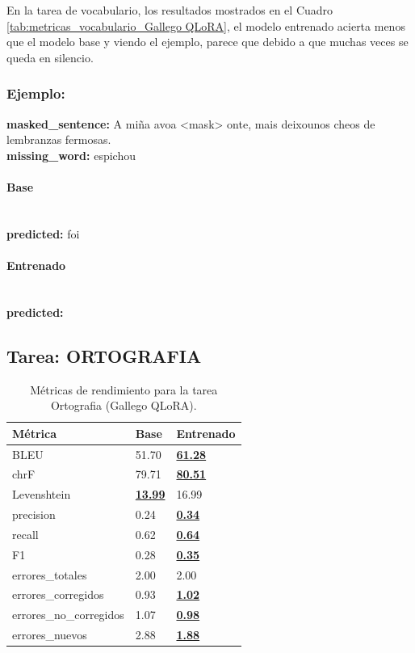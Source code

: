 En la tarea de vocabulario, los resultados mostrados en el Cuadro \ref{tab:metricas_vocabulario_Gallego QLoRA}, el modelo entrenado acierta menos que el modelo base y viendo el ejemplo, parece que debido a que muchas veces se queda en silencio.

\subsubsection{Ejemplo:}
\textbf{masked\_sentence:} A miña avoa {\textless}mask{\textgreater} onte, mais deixounos cheos de lembranzas fermosas.\\
\textbf{missing\_word:} espichou

\paragraph{Base}~\\
\textbf{predicted:} foi

\paragraph{Entrenado}~\\
\textbf{predicted:} 

\subsection{Tarea: ORTOGRAFIA}\label{tarea-ortografia}
\begin{longtable}[]{@{}lll@{}}
\toprule\noalign{}
Métrica & Base & Entrenado \\
\midrule\noalign{}
\endhead
\bottomrule\noalign{}
\caption{Métricas de rendimiento para la tarea Ortografia (Gallego QLoRA).}
\label{tab:metricas_ortografia_Gallego QLoRA}
\endlastfoot
BLEU & 51.70 & \textbf{\underline{61.28}} \\
chrF & 79.71 & \textbf{\underline{80.51}} \\
Levenshtein & \textbf{\underline{13.99}} & 16.99 \\
precision & 0.24 & \textbf{\underline{0.34}} \\
recall & 0.62 & \textbf{\underline{0.64}} \\
F1 & 0.28 & \textbf{\underline{0.35}} \\
errores\_totales & 2.00 & 2.00 \\
errores\_corregidos & 0.93 & \textbf{\underline{1.02}} \\
errores\_no\_corregidos & 1.07 & \textbf{\underline{0.98}} \\
errores\_nuevos & 2.88 & \textbf{\underline{1.88}} \\
\end{longtable}


